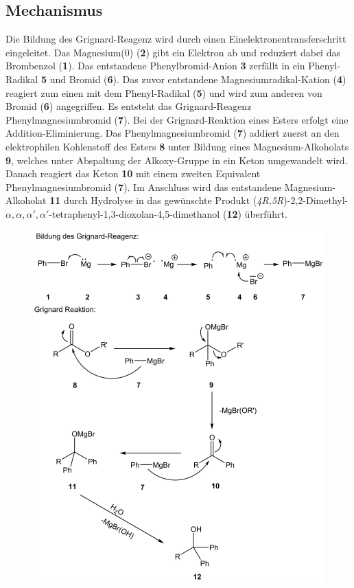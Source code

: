 \documentclass[12pt]{article}
\begin{document}
\begin{onehalfspace}
\section{Mechanismus\cite{metall}}
Die Bildung des Grignard-Reagenz wird durch einen Einelektronentransferschritt eingeleitet. Das Magnesium(0) (\textbf{2}) gibt ein Elektron ab und reduziert dabei das Brombenzol (\textbf{1}). Das entstandene Phenylbromid-Anion \textbf{3} zerfällt in ein Phenyl-Radikal \textbf{5} und Bromid (\textbf{6}). Das zuvor entstandene Magnesiumradikal-Kation (\textbf{4}) reagiert zum einen mit dem Phenyl-Radikal (\textbf{5}) und wird zum anderen von Bromid (\textbf{6}) angegriffen. Es entsteht das Grignard-Reagenz Phenylmagnesiumbromid (\textbf{7}).
Bei der Grignard-Reaktion eines Esters erfolgt eine Addition-Eliminierung. 
Das Phenylmagnesiumbromid (\textbf{7}) addiert zuerst an den elektrophilen Kohlenstoff des Esters \textbf{8} unter Bildung eines Magnesium-Alkoholats \textbf{9}, welches unter Abspaltung der Alkoxy-Gruppe in ein Keton umgewandelt wird. Danach reagiert das Keton \textbf{10} mit einem zweiten Equivalent Phenylmagnesiumbromid (\textbf{7}). Im Anschluss wird das entstandene Magnesium-Alkoholat \textbf{11} durch Hydrolyse in das gewünschte Produkt (\textit{4R,5R})-2,2-Dimethyl-$\alpha ,\alpha ,\alpha ',\alpha '$-tetraphenyl-1,3-dioxolan-4,5-dimethanol (\textbf{12}) überführt.

\begin{figure}[!htbp]
\centering
\includegraphics[width=\textwidth]{mechan.png}
\end{figure}
\clearpage

\end{onehalfspace}
\end{document}
